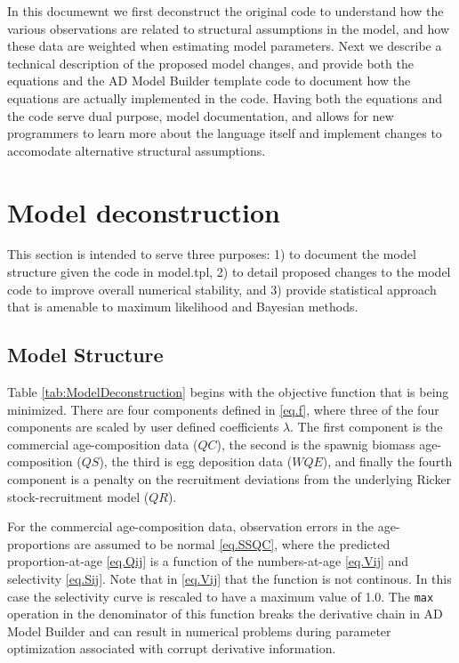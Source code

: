 \documentclass[12pt,letterpaper]{article}
\begin{document}
  In this documewnt we first deconstruct the original code to understand how the various observations are related to structural assumptions in the model, and how these data are weighted when estimating model parameters.  Next we describe a technical description of the proposed model changes, and provide both the equations and the AD Model Builder template code to document how the equations are actually implemented in the code.  Having both the equations and the code serve dual purpose, model documentation, and allows for new programmers to learn more about the language itself and implement changes to accomodate alternative structural assumptions.
  

  \section{Model deconstruction} %
  \label{sec:model_deconstruction}
  This section is intended to serve three purposes: 1) to document the model structure given the code in model.tpl,  2) to detail proposed changes to the model code to improve overall numerical stability, and 3) provide statistical approach that is amenable to maximum likelihood and Bayesian methods.

    \subsection{Model Structure} %
    \label{sub:model_structure}
    
    Table \ref{tab:ModelDeconstruction} begins with the objective function that is being minimized.   There are four components defined in \eqref{eq.f}, where three of the four components are scaled by user defined coefficients $\lambda$.  The first component is the commercial age-composition data ($QC$), the second is the spawnig biomass age-composition ($QS$), the third is egg deposition data ($WQE$), and finally the fourth component is a penalty on the recruitment deviations from the underlying Ricker stock-recruitment model ($QR$).

    For the commercial age-composition data, observation errors in the age-proportions are assumed to be normal \eqref{eq.SSQC}, where the predicted proportion-at-age \eqref{eq.Qij} is a function of the numbers-at-age \eqref{eq.Vij} and selectivity \eqref{eq.Sij}. Note that in \eqref{eq.Vij} that the function is not continous. In this case the selectivity curve is rescaled to have a maximum value of 1.0. The \texttt{max} operation in the denominator of this function breaks the derivative chain in AD Model Builder and can result in numerical problems during parameter optimization associated with corrupt derivative information. 
\end{document}

